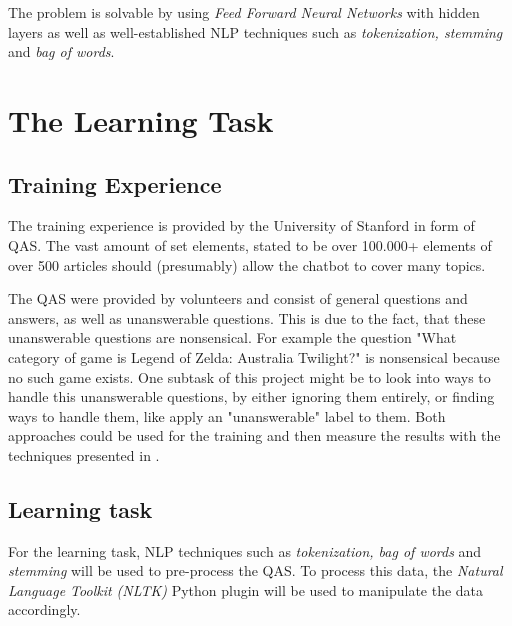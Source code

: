     The problem is solvable by using \emph{Feed Forward Neural Networks} with hidden layers as well as well-established NLP techniques such as \emph{tokenization, stemming} and \emph{bag of words}. 


\section{The Learning Task}
\label{sec:the-learning-task}

    
    \subsection{Training Experience}
    \label{subsec:-the-learning-task---training-experience}
        The training experience is provided by the University of Stanford in form of QAS.
        The vast amount of set elements, stated to be over 100.000+ elements of over 500 articles should (presumably) allow the chatbot to cover many topics.

        The QAS were provided by volunteers and consist of general questions and answers, as well as unanswerable questions.
        This is due to the fact, that these unanswerable questions are nonsensical.
        For example the question "What category of game is Legend of Zelda: Australia Twilight?" is nonsensical because no such game exists.
        One subtask of this project might be to look into ways to handle this unanswerable questions, by either ignoring them entirely, or finding ways to handle them, like apply an "unanswerable" label to them.
        Both approaches could be used for the training and then measure the results with the techniques presented in .
    
        
    \subsection{Learning task}
    \label{subsec:-the-learning-task---learning-task}
        For the learning task, NLP techniques such as \emph{tokenization, bag of words} and \emph{stemming} will be used to pre-process the QAS.
        To process this data, the \emph{Natural Language Toolkit (NLTK)} Python plugin will be used to manipulate the data accordingly.

